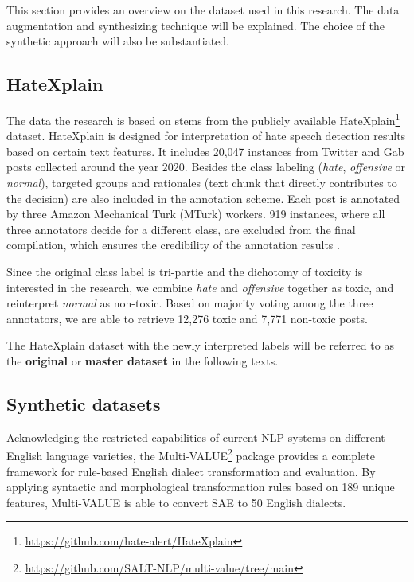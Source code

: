 \documentclass[11pt]{article}
\begin{document}
This section provides an overview on the dataset used in this research. The data augmentation and synthesizing technique will be explained. The choice of the synthetic approach will also be substantiated.

\subsection{HateXplain}

The data the research is based on stems from the publicly available HateXplain\footnote{\url{https://github.com/hate-alert/HateXplain}} dataset. HateXplain is designed for interpretation of hate speech detection results based on certain text features. It includes 20,047 instances from Twitter and Gab posts collected around the year 2020. Besides the class labeling (\textit{hate}, \textit{offensive} or \textit{normal}), targeted groups and rationales (text chunk that directly contributes to the decision) are also included in the annotation scheme. Each post is annotated by three Amazon Mechanical Turk (MTurk) workers. 919 instances, where all three annotators decide for a different class, are excluded from the final compilation, which ensures the credibility of the annotation results \citep{mathew-2021-hatexplain}.

Since the original class label is tri-partie and the dichotomy of toxicity is interested in the research, we combine \textit{hate} and \textit{offensive} together as toxic, and reinterpret \textit{normal} as non-toxic. Based on majority voting among the three annotators, we are able to retrieve 12,276 toxic and 7,771 non-toxic posts.

The HateXplain dataset with the newly interpreted labels will be referred to as the \textbf{original} or \textbf{master dataset} in the following texts.

\subsection{Synthetic datasets}

Acknowledging the restricted capabilities of current NLP systems on different English language varieties, the Multi-VALUE\footnote{\url{https://github.com/SALT-NLP/multi-value/tree/main}} package \citep{ziems-2023-multi} provides a complete framework for rule-based English dialect transformation and evaluation. By applying syntactic and morphological transformation rules based on 189 unique features, Multi-VALUE is able to convert SAE to 50 English dialects.
\end{document}
